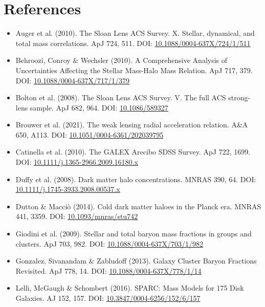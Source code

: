 \documentclass[11pt,a4paper]{article}
\begin{document}
\section{References}
\label{sec:references}
\begin{itemize}
  \item Auger et al. (2010). The Sloan Lens ACS Survey. X. Stellar, dynamical, and total mass correlations. ApJ 724, 511. DOI: \href{https://doi.org/10.1088/0004-637X/724/1/511}{10.1088/\allowbreak{}0004-637X/\allowbreak{}724/\allowbreak{}1/\allowbreak{}511}
  \item Behroozi, Conroy \& Wechsler (2010). A Comprehensive Analysis of Uncertainties Affecting the Stellar Mass-Halo Mass Relation. ApJ 717, 379. DOI: \href{https://doi.org/10.1088/0004-637X/717/1/379}{10.1088/\allowbreak{}0004-637X/\allowbreak{}717/\allowbreak{}1/\allowbreak{}379}
  \item Bolton et al. (2008). The Sloan Lens ACS Survey. V. The full ACS strong-lens sample. ApJ 682, 964. DOI: \href{https://doi.org/10.1086/589327}{10.1086/\allowbreak{}589327}
  \item Brouwer et al. (2021). The weak lensing radial acceleration relation. A\&A 650, A113. DOI: \href{https://doi.org/10.1051/0004-6361/202039795}{10.1051/\allowbreak{}0004-6361/\allowbreak{}202039795}
  \item Catinella et al. (2010). The GALEX Arecibo SDSS Survey. ApJ 722, 1699. DOI: \href{https://doi.org/10.1111/j.1365-2966.2009.16180.x}{10.1111/\allowbreak{}j.1365-2966.2009.16180.x}
  \item Duffy et al. (2008). Dark matter halo concentrations. MNRAS 390, 64. DOI: \href{https://doi.org/10.1111/j.1745-3933.2008.00537.x}{10.1111/\allowbreak{}j.1745-3933.2008.00537.x}
  \item Dutton \& Macci\`o (2014). Cold dark matter haloes in the Planck era. MNRAS 441, 3359. DOI: \href{https://doi.org/10.1093/mnras/stu742}{10.1093/\allowbreak{}mnras/\allowbreak{}stu742}
  \item Giodini et al. (2009). Stellar and total baryon mass fractions in groups and clusters. ApJ 703, 982. DOI: \href{https://doi.org/10.1088/0004-637X/703/1/982}{10.1088/\allowbreak{}0004-637X/\allowbreak{}703/\allowbreak{}1/\allowbreak{}982}
  \item Gonzalez, Sivanandam \& Zabludoff (2013). Galaxy Cluster Baryon Fractions Revisited. ApJ 778, 14. DOI: \href{https://doi.org/10.1088/0004-637X/778/1/14}{10.1088/\allowbreak{}0004-637X/\allowbreak{}778/\allowbreak{}1/\allowbreak{}14}
  \item Lelli, McGaugh \& Schombert (2016). SPARC: Mass Models for 175 Disk Galaxies. AJ 152, 157. DOI: \href{https://doi.org/10.3847/0004-6256/152/6/157}{10.3847/\allowbreak{}0004-6256/\allowbreak{}152/\allowbreak{}6/\allowbreak{}157}

\end{itemize}
\end{document}
